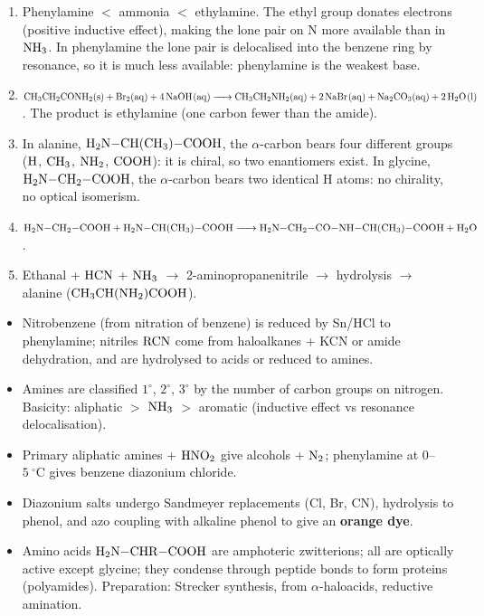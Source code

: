 \documentclass[11pt]{article}
\begin{document}
\begin{corrige}[Exercise 1]
\begin{enumerate}
\item Phenylamine $<$ ammonia $<$ ethylamine. The ethyl group donates electrons (positive inductive effect), making the lone pair on N more available than in $\ce{NH3}$. In phenylamine the lone pair is delocalised into the benzene ring by resonance, so it is much less available: phenylamine is the weakest base.
\item $\ce{CH3CH2CONH2(s) + Br2(aq) + 4NaOH(aq) -> CH3CH2NH2(aq) + 2NaBr(aq) + Na2CO3(aq) + 2H2O(l)}$. The product is ethylamine (one carbon fewer than the amide).
\item In alanine, $\ce{H2N-CH(CH3)-COOH}$, the $\alpha$-carbon bears four different groups ($\ce{H}$, $\ce{CH3}$, $\ce{NH2}$, $\ce{COOH}$): it is chiral, so two enantiomers exist. In glycine, $\ce{H2N-CH2-COOH}$, the $\alpha$-carbon bears two identical H atoms: no chirality, no optical isomerism.
\item $\ce{H2N-CH2-COOH + H2N-CH(CH3)-COOH -> H2N-CH2-CO-NH-CH(CH3)-COOH + H2O}$.
\item Ethanal + $\ce{HCN}$ + $\ce{NH3}$ $\rightarrow$ 2-aminopropanenitrile $\rightarrow$ hydrolysis $\rightarrow$ alanine ($\ce{CH3CH(NH2)COOH}$).
\end{enumerate}
\end{corrige}

\begin{aretenir}
\begin{itemize}
\item Nitrobenzene (from nitration of benzene) is reduced by Sn/HCl to phenylamine; nitriles $\ce{RCN}$ come from haloalkanes + KCN or amide dehydration, and are hydrolysed to acids or reduced to amines.
\item Amines are classified $1^{\circ}$, $2^{\circ}$, $3^{\circ}$ by the number of carbon groups on nitrogen. Basicity: aliphatic $>$ $\ce{NH3}$ $>$ aromatic (inductive effect vs resonance delocalisation).
\item Primary aliphatic amines + $\ce{HNO2}$ give alcohols + $\ce{N2}$; phenylamine at $0$--$\SI{5}{\ensuremath{{}^{\circ}\mathrm{C}}}$ gives benzene diazonium chloride.
\item Diazonium salts undergo Sandmeyer replacements (Cl, Br, CN), hydrolysis to phenol, and azo coupling with alkaline phenol to give an \textbf{orange dye}.
\item Amino acids $\ce{H2N-CHR-COOH}$ are amphoteric zwitterions; all are optically active except glycine; they condense through peptide bonds to form proteins (polyamides). Preparation: Strecker synthesis, from $\alpha$-haloacids, reductive amination.
\end{itemize}
\end{aretenir}
\end{document}
